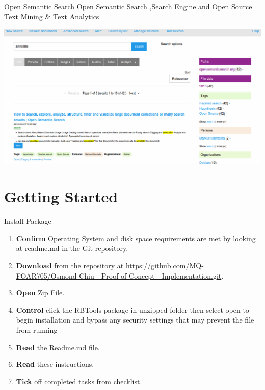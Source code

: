 \documentclass[10pt,a4paper]{article}
\begin{document}
\begin{textbox}{Open Semantic Search}
\href{https://www.opensemanticsearch.org}{Open Semantic Search} \sep \href{https://www.opensemanticsearch.org}{Search Engine and Open Source Text Mining & Text Analytics}

\includegraphics[width=\textwidth]{search.png}

\end{textbox}



\section{Getting Started}



\begin{textbox}{Install Package}
 

  

\begin{enumerate}
\item \textbf{Confirm} Operating System and disk space requirements are met by looking at readme.md in the Git repository.
\item \textbf{Download} from the repository at \href{https://github.com/MQ-FOAR705/Osmond-Chiu---Proof-of-Concept---Implementation.git}{https://github.com/MQ-FOAR705/Osmond-Chiu---Proof-of-Concept---Implementation.git}.
\item \textbf{Open} Zip File.
\item \textbf{Control}-click the RBTools package in unzipped folder then select open to begin installation and bypass any security settings that may prevent the file from running
\item \textbf{Read} the Readme.md file.
\item \textbf{Read} these instructions.
\item \textbf{Tick} off completed tasks from checklist.
\end{enumerate}

\end{textbox}
\end{document}
